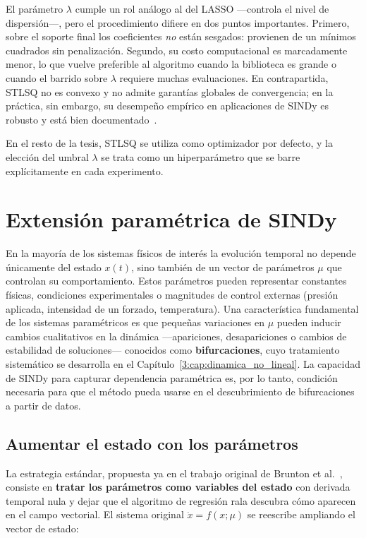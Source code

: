 El parámetro $\lambda$ cumple un rol análogo al del LASSO —controla el nivel de dispersión—, pero el procedimiento difiere en dos puntos importantes. Primero, sobre el soporte final los coeficientes \textit{no} están sesgados: provienen de un mínimos cuadrados sin penalización. Segundo, su costo computacional es marcadamente menor, lo que vuelve preferible al algoritmo cuando la biblioteca es grande o cuando el barrido sobre $\lambda$ requiere muchas evaluaciones. En contrapartida, STLSQ no es convexo y no admite garantías globales de convergencia; en la práctica, sin embargo, su desempeño empírico en aplicaciones de SINDy es robusto y está bien documentado~\cite{brunton2016pnas, desilva2020pysindy}.

En el resto de la tesis, STLSQ se utiliza como optimizador por defecto, y la elección del umbral $\lambda$ se trata como un hiperparámetro que se barre explícitamente en cada experimento.

\section{Extensión paramétrica de SINDy}
\label{2:sec:extension_parametrica}

En la mayoría de los sistemas físicos de interés la evolución temporal no depende únicamente del estado $x(t)$, sino también de un vector de parámetros $\mu$ que controlan su comportamiento. Estos parámetros pueden representar constantes físicas, condiciones experimentales o magnitudes de control externas (presión aplicada, intensidad de un forzado, temperatura). Una característica fundamental de los sistemas paramétricos es que pequeñas variaciones en $\mu$ pueden inducir cambios cualitativos en la dinámica —apariciones, desapariciones o cambios de estabilidad de soluciones— conocidos como \textbf{bifurcaciones}, cuyo tratamiento sistemático se desarrolla en el Capítulo~\ref{3:cap:dinamica_no_lineal}. La capacidad de SINDy para capturar dependencia paramétrica es, por lo tanto, condición necesaria para que el método pueda usarse en el descubrimiento de bifurcaciones a partir de datos.

\subsection{Aumentar el estado con los parámetros}

La estrategia estándar, propuesta ya en el trabajo original de Brunton et al.~\cite{brunton2016pnas}, consiste en \textbf{tratar los parámetros como variables del estado} con derivada temporal nula y dejar que el algoritmo de regresión rala descubra cómo aparecen en el campo vectorial. El sistema original $\dot{x} = f(x; \mu)$ se reescribe ampliando el vector de estado:


